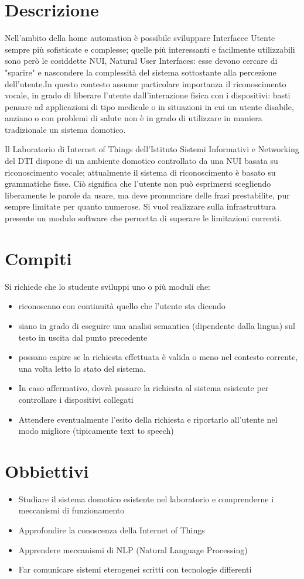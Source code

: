 \documentclass[twoside]{supsistudent}
\begin{document}
\section*{Descrizione}
Nell'ambito della home automation è possibile sviluppare Interfacce Utente sempre più sofisticate e complesse; quelle più interessanti e facilmente utilizzabili sono però le cosiddette NUI, Natural User Interfaces: esse devono cercare di "sparire" e nascondere la complessità del sistema sottostante alla percezione dell'utente.In questo contesto assume particolare importanza il riconoscimento vocale, in grado di liberare l'utente dall'interazione fisica con i dispositivi: basti pensare ad applicazioni di tipo medicale o in situazioni in cui un utente disabile, anziano o con problemi di salute non è in grado di utilizzare in maniera tradizionale un sistema domotico.

Il Laboratorio di Internet of Things dell'Istituto Sistemi Informativi 
e Networking del DTI dispone di un ambiente
domotico controllato da una NUI basata su riconoscimento vocale; 
attualmente il sistema di riconoscimento è basato su
grammatiche fisse. Ciò significa che l'utente non può esprimersi 
scegliendo liberamente le parole da usare, ma deve
pronunciare delle frasi prestabilite,
 pur sempre limitate per quanto numerose.
Si vuol realizzare sulla infrastruttura presente un modulo
 software che permetta di superare le limitazioni correnti.
\section*{Compiti}
Si richiede che lo studente sviluppi uno o più moduli che:
\begin{itemize}
\item riconoscano con continuità quello che l'utente sta dicendo
\item siano in grado di eseguire una analisi semantica (dipendente dalla lingua) 
sul testo in uscita dal punto precedente
\item possano capire se la richiesta effettuata è valida o meno nel contesto 
corrente, una volta letto lo stato del
sistema.
\item In caso affermativo, dovrà passare la richiesta al sistema esistente 
per controllare i dispositivi collegati
\item Attendere eventualmente l'esito della richiesta e riportarlo all'utente 
nel modo migliore (tipicamente text to speech)
\end{itemize}
\section*{Obbiettivi}
\begin{itemize}
\item Studiare il sistema domotico esistente nel laboratorio e comprenderne i meccanismi di funzionamento
\item Approfondire la conoscenza della Internet of Things
\item Apprendere meccanismi di NLP (Natural Language Processing)
\item Far comunicare sistemi eterogenei scritti con tecnologie differenti
\end{itemize}
\end{document}
